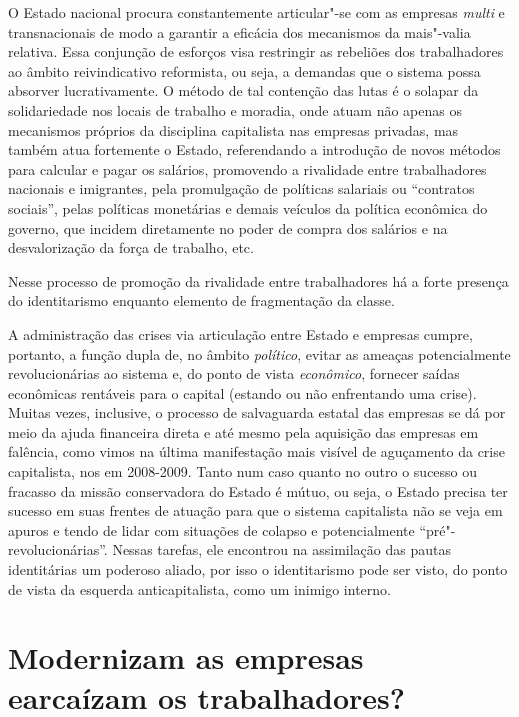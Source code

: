 O Estado nacional procura constantemente articular"-se com as empresas
\emph{multi} e transnacionais de modo a garantir a eficácia dos
mecanismos da mais"-valia relativa. Essa conjunção de esforços visa
restringir as rebeliões dos trabalhadores ao âmbito reivindicativo
reformista, ou seja, a demandas que o sistema possa absorver
lucrativamente. O método de tal contenção das lutas é o solapar da
solidariedade nos locais de trabalho e moradia, onde atuam não apenas os
mecanismos próprios da disciplina capitalista nas empresas privadas, mas
também atua fortemente o Estado, referendando a introdução de novos
métodos para calcular e pagar os salários, promovendo a rivalidade entre
trabalhadores nacionais e imigrantes, pela promulgação de políticas
salariais ou ``contratos sociais'', pelas políticas monetárias e demais
veículos da política econômica do governo, que incidem diretamente no
poder de compra dos salários e na desvalorização da força de trabalho,
etc.

Nesse processo de promoção da rivalidade entre trabalhadores há a forte
presença do identitarismo enquanto elemento de fragmentação da classe.

A administração das crises via articulação entre Estado e empresas
cumpre, portanto, a função dupla de, no âmbito \emph{político}, evitar
as ameaças potencialmente revolucionárias ao sistema e, do ponto de
vista \emph{econômico}, fornecer saídas econômicas rentáveis para o
capital (estando ou não enfrentando uma crise). Muitas vezes, inclusive,
o processo de salvaguarda estatal das empresas se dá por meio da ajuda
financeira direta e até mesmo pela aquisição das empresas em falência,
como vimos na última manifestação mais visível de aguçamento da crise
capitalista, nos  em 2008-2009. Tanto num caso quanto no outro o
sucesso ou fracasso da missão conservadora do Estado é mútuo, ou seja, o
Estado precisa ter sucesso em suas frentes de atuação para que o sistema
capitalista não se veja em apuros e tendo de lidar com situações de
colapso e potencialmente ``pré"-revolucionárias''. Nessas tarefas, ele
encontrou na assimilação das pautas identitárias um poderoso aliado, por
isso o identitarismo pode ser visto, do ponto de vista da esquerda
anticapitalista, como um inimigo interno.

\chapter*{Modernizam as empresas e\break arcaízam os trabalhadores?}

